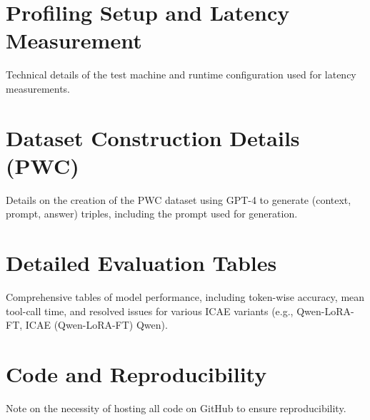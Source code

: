 \section{Profiling Setup and Latency Measurement}

Technical details of the test machine and runtime configuration used for latency measurements.


\section{Dataset Construction Details (PWC)}

Details on the creation of the PWC dataset using GPT-4 to generate (context, prompt, answer) triples, including the prompt used for generation.


\section{Detailed Evaluation Tables}

Comprehensive tables of model performance, including token-wise accuracy, mean tool-call time, and resolved issues for various ICAE \cite{ge_-context_2024} variants (e.g., Qwen-LoRA-FT, ICAE (Qwen-LoRA-FT) Qwen).


\section{Code and Reproducibility}

Note on the necessity of hosting all code on GitHub to ensure reproducibility.
